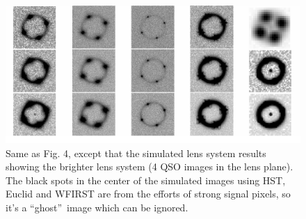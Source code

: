 \documentclass[a4paper,11pt]{article}
\begin{document}
\begin{figure}
\begin{center}
\includegraphics[width=1.0\textwidth]{figures/brighter_system_4QSOimages_all.png}
\end{center}
\caption{Same as Fig. 4, except that the simulated lens system results showing the brighter lens system (4 QSO images in the lens plane). The black spots in the center of the simulated images using HST, Euclid and WFIRST are from the efforts of strong signal pixels, so it's a \textquotedblleft ghost\textquotedblright\ image which can be ignored.}
\label{fig:brighter_4QSOimages_montage}
\end{figure}
\end{document}
